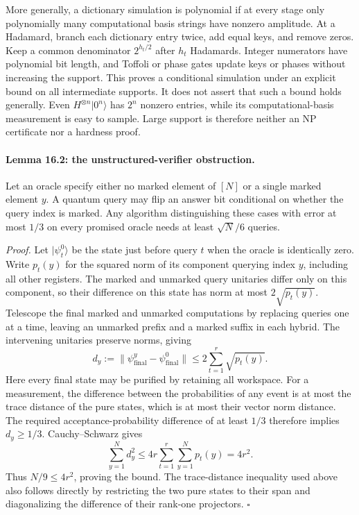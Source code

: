 \documentclass[11pt]{article}
\begin{document}
More generally, a dictionary simulation is polynomial if at every stage
only polynomially many computational basis strings have nonzero amplitude.
At a Hadamard, branch each dictionary entry twice, add equal keys, and remove
zeros. Keep a common denominator $2^{h_t/2}$ after $h_t$ Hadamards. Integer
numerators have polynomial bit length, and Toffoli or phase gates update keys
or phases without increasing the support. This proves a conditional simulation
under an explicit bound on all intermediate supports. It does not assert that
such a bound holds generally. Even $H^{\otimes n}|0^n\rangle$ has $2^n$
nonzero entries, while its computational-basis measurement is easy to sample.
Large support is therefore neither an NP certificate nor a hardness proof.

\paragraph{Lemma 16.2: the unstructured-verifier obstruction.}
Let an oracle specify either no marked element of $[N]$ or a single marked
element $y$. A quantum query may flip an answer bit conditional on whether
the query index is marked. Any algorithm distinguishing these cases with
error at most $1/3$ on every promised oracle needs at least $\sqrt N/6$
queries.

\emph{Proof.} Let $|\psi_t^0\rangle$ be the state just before query $t$
when the oracle is identically zero. Write $p_t(y)$ for the squared norm
of its component querying index $y$, including all other registers.
The marked and unmarked query unitaries differ only on this component,
so their difference on this state has norm at most $2\sqrt{p_t(y)}$.
Telescope the final marked and unmarked computations by replacing queries
one at a time, leaving an unmarked prefix and a marked suffix in each
hybrid. The intervening unitaries preserve norms, giving
\[
 d_y:=\|\psi_{\mathrm{final}}^y-\psi_{\mathrm{final}}^0\|
       \le2\sum_{t=1}^r\sqrt{p_t(y)}.
\]
Here every final state may be purified by retaining all workspace. For a
measurement, the difference between the probabilities of any event is at
most the trace distance of the pure states, which is at most their vector
norm distance. The required acceptance-probability difference of at least
$1/3$ therefore implies $d_y\ge1/3$. Cauchy--Schwarz gives
\[
 \sum_{y=1}^N d_y^2
 \le4r\sum_{t=1}^r\sum_{y=1}^N p_t(y)=4r^2.
\]
Thus $N/9\le4r^2$, proving the bound. The trace-distance inequality used
above also follows directly by restricting the two pure states to their
span and diagonalizing the difference of their rank-one projectors.
\hfill$\square$
\end{document}
